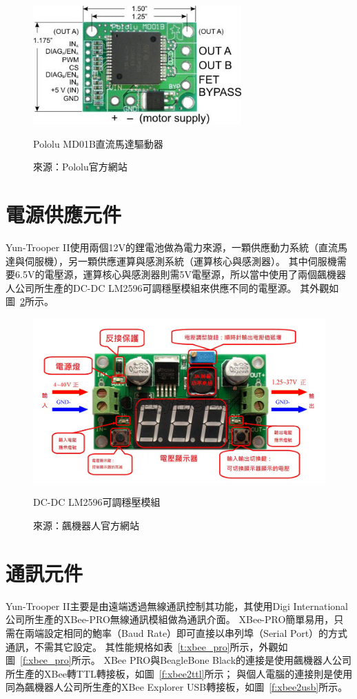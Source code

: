 \begin{figure}[h!]
	\centering
	\includegraphics[width=8cm]{figures/hardware/motor_driver}
	\caption{Pololu MD01B直流馬達驅動器}
	\caption*{來源：Pololu官方網站}
	\label{f:motor_driver}
\end{figure}

\section{電源供應元件}
Yun-Trooper II使用兩個12V的鋰電池做為電力來源，一顆供應動力系統（直流馬達與伺服機），另一顆供應運算與感測系統（運算核心與感測器）。
其中伺服機需要6.5V的電壓源，運算核心與感測器則需5V電壓源，所以當中使用了兩個飆機器人公司所生產的DC-DC LM2596可調穩壓模組來供應不同的電壓源。
其外觀如圖~\ref{f:lm2596}所示。

\begin{figure}[h!]
	\centering
	\includegraphics[width=14cm]{figures/hardware/LM2596}
	\caption{DC-DC LM2596可調穩壓模組}
	\caption*{來源：飆機器人官方網站}
	\label{f:lm2596}
\end{figure}

\section{通訊元件}
Yun-Trooper II主要是由遠端透過無線通訊控制其功能，其使用Digi International公司所生產的XBee-PRO無線通訊模組做為通訊介面。
XBee-PRO簡單易用，只需在兩端設定相同的鮑率（Baud Rate）即可直接以串列埠（Serial Port）的方式通訊，不需其它設定。
其性能規格如表~\ref{t:xbee_pro}所示，外觀如圖~\ref{f:xbee_pro}所示。
XBee PRO與BeagleBone Black的連接是使用飆機器人公司所生產的XBee轉TTL轉接板，如圖~\ref{f:xbee2ttl}所示；
與個人電腦的連接則是使用同為飆機器人公司所生產的XBee Explorer USB轉接板，如圖~\ref{f:xbee2usb}所示。

